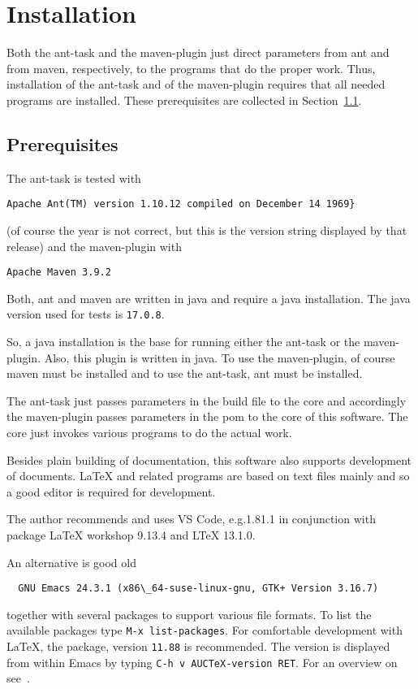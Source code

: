 
\chapter{Installation}\label{chap:install}

Both the ant-task and the maven-plugin just direct parameters 
from ant and from maven, respectively, 
to the programs that do the proper work. 
Thus, installation of the ant-task and of the maven-plugin 
requires that all needed programs are installed. 
These prerequisites are collected in Section~\ref{sec:prerequisites}. 

\section{Prerequisites}\label{sec:prerequisites}

The ant-task is tested with 
%
\begin{verbatim}
Apache Ant(TM) version 1.10.12 compiled on December 14 1969}
\end{verbatim}
%
(of course the year is not correct, but this is the version string
displayed by that release) and the maven-plugin with 
%
\begin{verbatim}
Apache Maven 3.9.2 
\end{verbatim}
%
Both, ant and maven are written in java and require a java installation. 
The java version used for tests is \texttt{17.0.8}. 


So, a java installation is the base for running either the ant-task 
or the maven-plugin. 
Also, this plugin is written in java. 
To use the maven-plugin, of course maven must be installed 
and to use the ant-task, ant must be installed. 

The ant-task just passes parameters in the build file to the core 
and accordingly the maven-plugin passes parameters in the pom 
to the core of this software. 
The core just invokes various programs to do the actual work. 

Besides plain building of documentation, 
this software also supports development of documents. 
\LaTeX{} and related programs are based on text files mainly 
and so a good editor is required for development. 

The author recommends and uses VS Code, e.g.\@ 1.81.1 
in conjunction with package \LaTeX{} workshop 9.13.4 and LTeX 13.1.0. 

An alternative is good old 
%
\begin{verbatim}
  GNU Emacs 24.3.1 (x86\_64-suse-linux-gnu, GTK+ Version 3.16.7)
\end{verbatim}
%
together with several packages to support 
various file formats. 
To list the available packages type 
\texttt{M-x list-packages}. 
For comfortable development with \LaTeX, 
the \auctex{} package, version \texttt{11.88} is recommended. 
The version is displayed from within Emacs 
by typing \texttt{C-h v AUCTeX-version RET}. 
For an overview on \auctex{} see~\cite{AucTeX}. 


